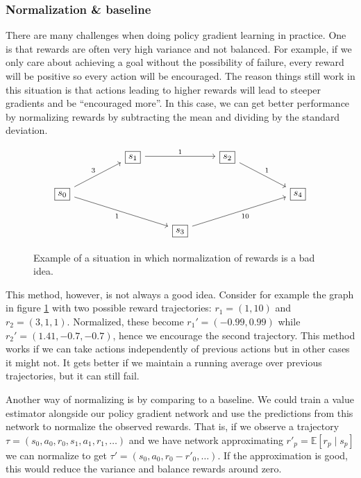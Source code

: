 \documentclass{article}
\theoremstyle{changedot}
\theoremstyle{changedotbreak}
\theoremstyle{nonumberplain}
\newcommand{\m}{\mathbb}
\begin{document}
\subsubsection{Normalization \& baseline}
There are many challenges when doing policy gradient learning in practice. One is that rewards are often very high variance and not balanced. For example, if we only care about achieving a goal without the possibility of failure, every reward will be positive so every action will be encouraged. The reason things still work in this situation is that actions leading to higher rewards will lead to steeper gradients and be ``encouraged more''. In this case, we can get better performance by normalizing rewards by subtracting the mean and dividing by the standard deviation.

\begin{figure}[h!]
\[\begin{tikzcd}
	&& {\boxed{s_1}} && {\boxed{s_2}} \\
	{\boxed{s_0}} &&&&&& {\boxed{s_4}} \\
	&&& {\boxed{s_3}}
	\arrow["3", from=2-1, to=1-3]
	\arrow["1"', from=2-1, to=3-4]
	\arrow["1", from=1-3, to=1-5]
	\arrow["1", from=1-5, to=2-7]
	\arrow["10"', from=3-4, to=2-7]
\end{tikzcd}\]
\caption{Example of a situation in which normalization of rewards is a bad idea.}
\label{fig:bad_norm}
\end{figure}

This method, however, is not always a good idea. Consider for example the graph in figure \ref{fig:bad_norm} with two possible reward trajectories: $r_{1} = (1, 10)$ and $r_{2} = (3, 1, 1)$. Normalized, these become $r_{1}' = (-0.99, 0.99)$ while $r_{2}' = (1.41, -0.7, -0.7)$, hence we encourage the second trajectory. This method works if we can take actions independently of previous actions but in other cases it might not. It gets better if we maintain a running average over previous trajectories, but it can still fail.

Another way of normalizing is by comparing to a baseline. We could train a value estimator alongside our policy gradient network and use the predictions from this network to normalize the observed rewards. That is, if we observe a trajectory $\tau = (s_{0}, a_{0}, r_{0}, s_{1}, a_{1}, r_{1}, \dots)$ and we have network approximating $r'_{p} = \m E[r_{p} \mid s_{p}]$ we can normalize to get $\tau' = (s_{0}, a_{0}, r_{0} - r'_{0}, \dots)$. If the approximation is good, this would reduce the variance and balance rewards around zero.
\end{document}
